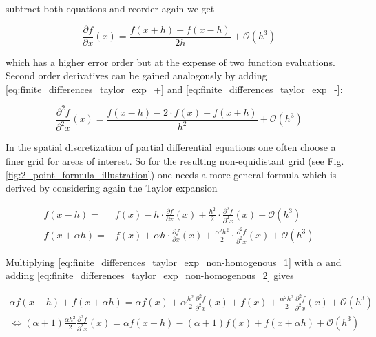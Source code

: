 \documentclass{scrartcl}[12pt, halfparskip]
\begin{document}
subtract both equations and reorder again we get

\begin{equation}
\frac{\partial f}{\partial x}(x) = \frac{f(x+h) - f(x-h)}{2 h} + \mathcal{O}(h^3)
\end{equation}

which has a higher error order but at the expense of two function evaluations. \\

Second order derivatives can be gained analogously by adding \eqref{eq:finite_differences_taylor_exp_+} and \eqref{eq:finite_differences_taylor_exp_-}:

\begin{equation}
\frac{\partial^2 f}{\partial^2 x}(x) = \frac{f(x-h) - 2 \cdot f(x) + f(x+h)}{h^2} + \mathcal{O}(h^3)
\label{eq:finite_difference_2nd_der}
\end{equation}





In the spatial discretization of partial differential equations one often choose a finer grid for areas of interest. So for the resulting non-equidistant grid (see Fig. \ref{fig:2_point_formula_illustration}) one needs a more general formula which is derived by considering again the Taylor expansion





\begin{subequations}
	\label{eq:finite_differences_taylor_exp_non-homogenous}
	\begin{align}
	f(x-h) = & f(x) - h \cdot \frac{\partial f}{\partial x}(x) + \frac{h^2}{2} \cdot \frac{\partial^2 f}{\partial^2 x}(x) + \mathcal{O}(h^3) \label{eq:finite_differences_taylor_exp_non-homogenous_1} \\
	f(x+\alpha h) = & f(x) + \alpha h \cdot \frac{\partial f}{\partial x}(x) + \frac{\alpha^2 h^2}{2} \cdot \frac{\partial^2 f}{\partial^2 x}(x) + \mathcal{O}(h^3)  \label{eq:finite_differences_taylor_exp_non-homogenous_2}
	\end{align}
\end{subequations}



Multiplying \eqref{eq:finite_differences_taylor_exp_non-homogenous_1} with $\alpha$ and adding \eqref{eq:finite_differences_taylor_exp_non-homogenous_2} gives

\begin{align}
\alpha f(x-h) + f(x+\alpha h) = \alpha f(x) + \alpha \frac{h^2}{2} \frac{\partial^2 f}{\partial^2 x}(x) + f(x) + \frac{\alpha^2 h^2}{2} \frac{\partial^2 f}{\partial^2 x}(x) + \mathcal{O}(h^3)  \\
\Leftrightarrow (\alpha+1) \frac{\alpha h^2}{2} \frac{\partial^2 f}{\partial^2 x}(x) = \alpha f(x-h) - (\alpha+1) f(x) + f(x+\alpha h) + \mathcal{O}(h^3) 
\end{align}
\end{document}
